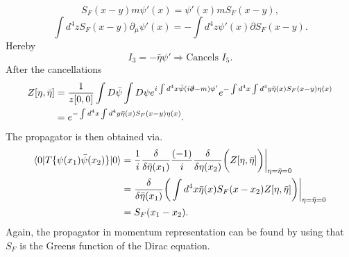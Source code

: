 \begin{equation}
	S_F(x-y)m\psi'(x)=\psi'(x)mS_F(x-y),
\end{equation} 
\begin{equation}
	\int d^4z S_F(x-y)\partial_\mu\psi'(x)=-\int d^4z\psi'(x)\partial S_F(x-y).
\end{equation} 
Hereby
\begin{equation}
	I_3=-\bar{\eta}\psi'\Rightarrow \text{Cancels } I_5.
\end{equation} 
After the cancellations
\begin{equation}
	\begin{split}
		Z[\eta,\bar{\eta}]&=\frac{1}{z[0,0]}\int D\bar{\psi}\int D\psi e^{i\int d^4x \bar{\psi}(i\slashed \partial -m)\psi'}e^{-\int d^4x\int d^4y \bar{\eta}(x)S_F(x-y)\eta(x)}\\
		&=e^{-\int d^4x\int d^4y \bar{\eta}(x)S_F(x-y)\eta(x)}.\\
	\end{split}
\end{equation} 
The propagator is then obtained via.
\begin{equation}
	\begin{split}
		\braket{0|T\{\psi(x_1)\bar{\psi}(x_2)\}|0}&=\frac{1}{i}\frac{\delta}{\delta \bar{\eta}(x_1)}\frac{(-1)}{i}\frac{\delta}{\delta \eta(x_2)}\bigg(Z[\eta,\bar{\eta}]\bigg)\bigg|_{\eta=\bar{\eta}=0}\\
		&=\frac{\delta}{\delta \bar{\eta}(x_1)}\bigg(\int d^4x \bar{\eta}(x)S_F(x-x_2)Z[\eta,\bar{\eta}]\bigg)\bigg|_{\eta=\bar{\eta}=0}\\
		&=S_F(x_1-x_2).
	\end{split}
\end{equation}  
Again, the propagator in momentum representation can be found by using that $S_F$ is the Greens function of the Dirac equation. 

